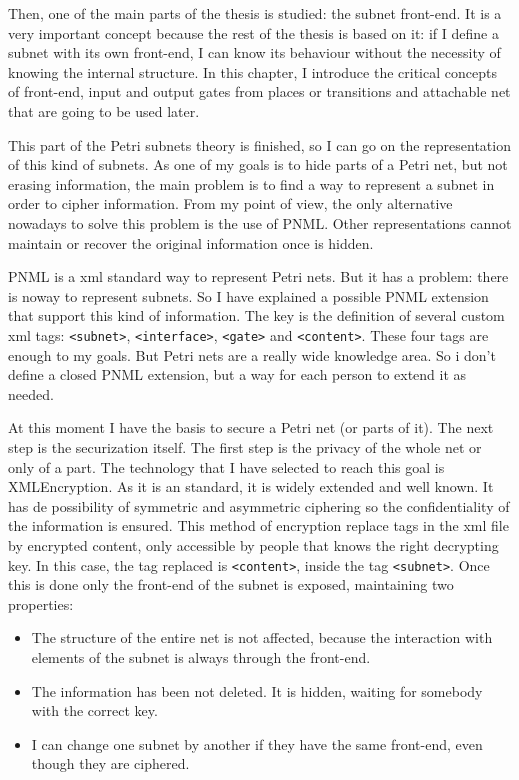 Then, one of the main parts of the thesis is studied: the subnet front-end.
It is a very important concept because the rest of the thesis is based on
it: if I define a subnet with its own front-end, I can know its behaviour without the necessity of knowing the internal structure. In this chapter, I introduce the critical concepts of front-end, input and output gates from
places or transitions and attachable net that are going to be used later.

This part of the Petri subnets theory is finished, so I can go on the representation
of this kind of subnets. As one of my goals is to hide parts of a Petri net,
but not erasing information, the main problem is to find a way to represent
a subnet in order to cipher information. From my point of view, the only alternative nowadays to solve this problem is the use of PNML. Other representations
cannot maintain or recover the original information once is hidden.

PNML is a xml standard way to represent Petri nets. But it has a problem:
there is noway to represent subnets. So I have explained a possible PNML extension
that support this kind of information. The key is the definition of several custom xml tags: \texttt{<subnet>}, \texttt{<interface>}, \texttt{<gate>} and \texttt{<content>}. These four tags are enough to my goals. But Petri
nets are a really wide knowledge area. So i don't define a closed PNML extension, but a way for each person to extend it as needed. 

At this moment I have the basis to secure a Petri net (or parts of it). The
next step is the securization itself. The first step is the privacy of the whole
net or only of a part. The technology that I have selected to reach this goal is XMLEncryption. As it is an standard, it is widely extended and
well known. It has de possibility of symmetric and asymmetric ciphering so
the confidentiality of the information is ensured. This method of encryption replace tags in the xml file by encrypted content, only accessible by people
that
knows the right decrypting key. In this case, the tag replaced is \texttt{<content>}, inside
the tag \texttt{<subnet>}. Once this is done only the front-end of the subnet
is exposed, maintaining two properties:

\begin{itemize}
\item The structure of the entire net is not affected, because the interaction
with elements of the subnet is always through the front-end.
\item The information has been not deleted. It is hidden, waiting for somebody
with the correct key.
\item I can change one subnet by another if they have the same front-end,
even though they are ciphered.
\end{itemize} 

